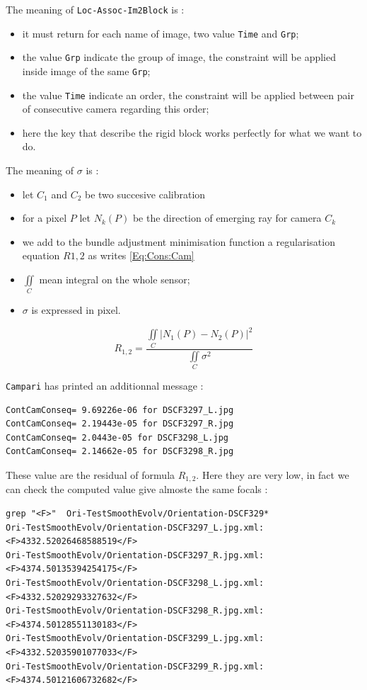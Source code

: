 The meaning of {\tt Loc-Assoc-Im2Block} is :

\begin{itemize}
    \item it must return for each name of image, two value {\tt Time} and {\tt Grp};
    \item the value {\tt Grp} indicate the group of image, the constraint will be applied inside
          image of the same {\tt Grp};
    \item the value {\tt Time} indicate an order, the constraint will be applied between pair of
          consecutive camera regarding this order;
    \item  here the key that describe the rigid block works perfectly for what we want to do.
\end{itemize}

The meaning of $\sigma$ is :

\begin{itemize}
   \item let $C_1$ and $C_2$ be  two succesive calibration
   \item for a pixel $P$ let $N_k(P)$ be the direction of emerging ray for camera $C_k$
   \item we add to the bundle adjustment minimisation function a regularisation equation $R{1,2} $ as writes  \ref{Eq:Cons:Cam}
   \item  $\iint \limits_{C}$ mean integral on the whole sensor;
   \item  $ \sigma$ is expressed in pixel.
\end{itemize}

\begin{equation}
   R_{1,2} = \frac{\iint \limits_{C} |N_1(P)-N_2(P)|^2} {\iint  \limits_{C} \sigma ^2} 
  \label{Eq:Cons:Cam}
\end{equation}

{\tt Campari} has printed an additionnal message :


\begin{verbatim}
ContCamConseq= 9.69226e-06 for DSCF3297_L.jpg
ContCamConseq= 2.19443e-05 for DSCF3297_R.jpg
ContCamConseq= 2.0443e-05 for DSCF3298_L.jpg
ContCamConseq= 2.14662e-05 for DSCF3298_R.jpg
\end{verbatim}

These value are the residual of formula $ R_{1,2}$. Here they are very low,
in fact we can check the computed value give almoste the same focals :

\begin{verbatim}
grep "<F>"  Ori-TestSmoothEvolv/Orientation-DSCF329*
Ori-TestSmoothEvolv/Orientation-DSCF3297_L.jpg.xml:               <F>4332.52026468588519</F>
Ori-TestSmoothEvolv/Orientation-DSCF3297_R.jpg.xml:               <F>4374.50135394254175</F>
Ori-TestSmoothEvolv/Orientation-DSCF3298_L.jpg.xml:               <F>4332.52029293327632</F>
Ori-TestSmoothEvolv/Orientation-DSCF3298_R.jpg.xml:               <F>4374.50128551130183</F>
Ori-TestSmoothEvolv/Orientation-DSCF3299_L.jpg.xml:               <F>4332.52035901077033</F>
Ori-TestSmoothEvolv/Orientation-DSCF3299_R.jpg.xml:               <F>4374.50121606732682</F>
\end{verbatim}





